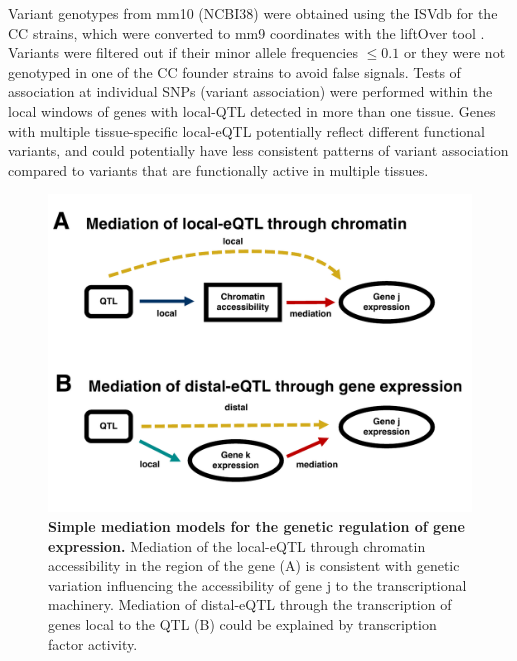\documentclass[9pt,twocolumn,twoside]{gsajnl}
\begin{document}
Variant genotypes from mm10 (NCBI38) were obtained using the ISVdb \citep{Oreper2017} for the CC strains, which were converted to mm9 coordinates with the liftOver tool \citep{Lawrence2009}. Variants were filtered out if their minor allele frequencies $\le 0.1$ or they were not genotyped in one of the CC founder strains to avoid false signals.
Tests of association at individual SNPs (variant association) were performed within the local windows of genes with local-QTL detected in more than one tissue. 
Genes with multiple tissue-specific local-eQTL potentially reflect different functional variants, and could potentially have less consistent patterns of variant association compared to variants that are functionally active in multiple tissues.

\begin{figure}[htbp]
\renewcommand{\familydefault}{\sfdefault}\normalfont
\centering
\includegraphics[width=\linewidth, clip, trim={0in 0.5in 0in 0in}]{figs/mediation_graph.pdf}
\caption{\textbf{Simple mediation models for the genetic regulation of gene expression.} Mediation of the local-eQTL through chromatin accessibility in the region of the gene (A) is consistent with genetic variation influencing the accessibility of gene j to the transcriptional machinery. Mediation of distal-eQTL through the transcription of genes local to the QTL (B) could be explained by transcription factor activity. 
\label{fig:graph}}
\end{figure}
\end{document}
